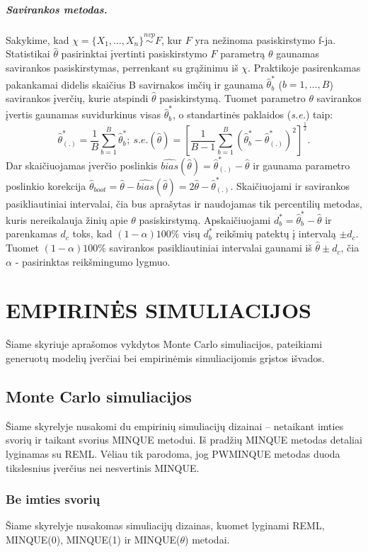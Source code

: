 \documentclass[12pt,a4paper]{article}
\begin{document}
\subparagraph{Savirankos metodas.} Sakykime, kad $\chi = \{X_1,\dots,X_n\}\stackrel{nvp}{\sim}F$, kur $F$ yra nežinoma pasiskirstymo f-ja. Statistikai $\hat{\theta}$ pasirinktai įvertinti pasiskirstymo $F$ parametrą $\theta$ gaunamas savirankos pasiskirstymas, perrenkant su grąžinimu iš $\chi$. Praktikoje pasirenkamas pakankamai didelis skaičius B savirnakos imčių ir gaunama $\hat{\theta}^*_b$ ($b=1,\dots,B$) savirankos įverčių, kurie atspindi $\hat{\theta}$ pasiskirstymą. Tuomet parametro $\theta$ savirankos įvertis gaunamas suvidurkinus visas $\hat{\theta}^*_b$, o standartinės paklaidos (\textit{s.e.}) taip:
\[
\hat{\theta}^*_{(.)}=\frac{1}{B}\sum^B_{b=1}\hat{\theta}^*_b; \
s.e.(\hat{\theta})=\left[\frac{1}{B-1}\sum^B_{b=1}(\hat{\theta}^*_b - \hat{\theta}^*_{(.)})^2\right]^{\frac{1}{2}}.
\]
Dar skaičiuojamas įverčio poslinkis $\widehat{bias}(\hat{\theta})=\hat{\theta}^*_{(.)}-\hat{\theta}$ ir gaunama parametro poslinkio korekcija $\hat{\theta}_{boot}=\hat{\theta}-\widehat{bias}(\hat{\theta})=2\hat{\theta}-\hat{\theta}^*_{(.)}$. Skaičiuojami ir savirankos pasikliautiniai intervalai, čia bus aprašytas ir naudojamas tik percentilių metodas, kuris nereikalauja žinių apie $\theta$ pasiskirstymą. Apskaičiuojami $d^*_b=\hat{\theta}^*_b-\hat{\theta}$ ir parenkamas $d_c$ toks, kad $(1-\alpha)100\%$ visų $d^*_b$ reikšmių patektų į intervalą $\pm d_c$. Tuomet $(1-\alpha)100\%$ savirankos pasikliautiniai intervalai gaunami iš $\hat{\theta}\pm d_c$, čia $\alpha$ - pasirinktas reikšmingumo lygmuo.




\newpage
\section{EMPIRINĖS SIMULIACIJOS} \label{sec:simul}
\indent Šiame skyriuje aprašomos vykdytos Monte Carlo simuliacijos, pateikiami generuotų modelių įverčiai bei empirinėmis simuliacijomis grįstos išvados.


\subsection{Monte Carlo simuliacijos}
\indent Šiame skyrelyje nusakomi du empirinių simuliacijų dizainai -- netaikant imties svorių ir taikant svorius MINQUE metodui. Iš pradžių MINQUE metodas detaliai lyginamas su REML. Vėliau tik parodoma, jog PWMINQUE metodas duoda tikslesnius įverčius nei nesvertinis MINQUE.

\subsubsection{Be imties svorių}\label{subsubsec:besvoriu}
\indent Šiame skyrelyje nusakomas simuliacijų dizainas, kuomet lyginami REML, MINQUE(0), MINQUE(1) ir MINQUE($\theta$) metodai.
\end{document}
